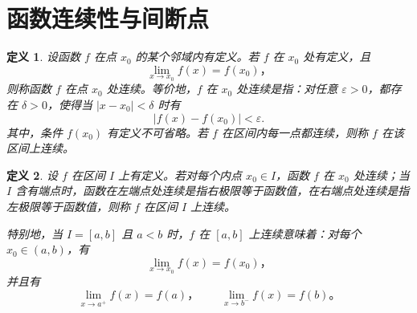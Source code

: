 \documentclass[UTF8,fontset=fandol,11pt]{ctexart}
\newtheorem{definition}{定义}[section]
\begin{document}
\section{函数连续性与间断点}\label{sec:S04}
\begin{definition}
设函数 $f$ 在点 $x_0$ 的某个邻域内有定义。若 $f$ 在 $x_0$ 处有定义，且
\[
\lim_{x\to x_0}f(x)=f(x_0)\text{，}
\]
则称函数 $f$ 在点 $x_0$ 处连续。等价地，$f$ 在 $x_0$ 处连续是指：对任意 $\varepsilon>0$，都存在 $\delta>0$，使得当 $|x-x_0|<\delta$ 时有
\[
|f(x)-f(x_0)|<\varepsilon.
\]
其中，条件 $f(x_0)$ 有定义不可省略。若 $f$ 在区间内每一点都连续，则称 $f$ 在该区间上连续。\label{def:point-continuity}
\end{definition}
\begin{definition}
设 $f$ 在区间 $I$ 上有定义。若对每个内点 $x_0\in I$，函数 $f$ 在 $x_0$ 处连续；当 $I$ 含有端点时，函数在左端点处连续是指右极限等于函数值，在右端点处连续是指左极限等于函数值，则称 $f$ 在区间 $I$ 上连续。

特别地，当 $I=[a,b]$ 且 $a<b$ 时，$f$ 在 $[a,b]$ 上连续意味着：对每个 $x_0\in(a,b)$，有
\[
\lim_{x\to x_0}f(x)=f(x_0)\text{，}
\]
并且有
\[
\lim_{x\to a^+}f(x)=f(a)\text{，}
\qquad
\lim_{x\to b^-}f(x)=f(b)\text{。}
\]
\label{def:interval-continuity}
\end{definition}
\end{document}
